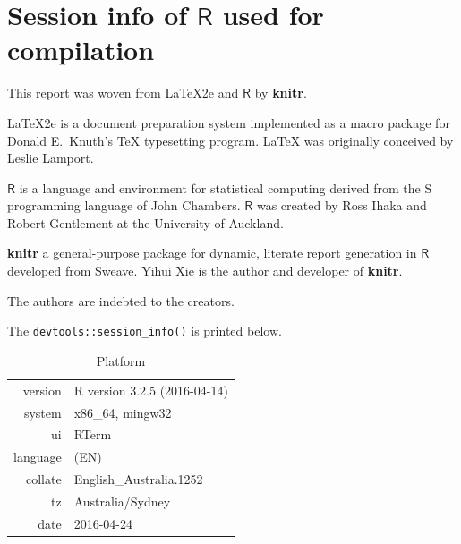 \documentclass{grattan}\usepackage[]{graphicx}\usepackage[]{color}
\begin{document}
\chapter{Session info of $\mathsf{R}$ used for compilation}
\begin{multicols*}{2}
This report was woven from  \textrm{\LaTeX2e} and $\mathsf{R}$ by \textbf{knitr}. 

\textrm{\LaTeX2e} is a document preparation system implemented as a macro package for Donald E.\ Knuth's \textrm{\TeX} typesetting program. \textrm{\LaTeX} was originally conceived by Leslie Lamport. 

$\mathsf{R}$ is a language and environment for statistical computing derived from the S programming language of John Chambers. $\mathsf{R}$ was created by Ross Ihaka and Robert Gentlement at the University of Auckland. 

\textbf{knitr} a general-purpose package for dynamic, literate report generation in $\mathsf{R}$ developed from Sweave. Yihui Xie is the author and developer of \textbf{knitr}. 

The authors are indebted to the creators.

The \verb=devtools::session_info()= is printed below.
\end{multicols*}


\begin{table}[!htb]
\centering
\caption{Platform}
\begin{tabular}{rl}
  \toprule
 version & R version 3.2.5 (2016-04-14) \\ 
  system & x86\_64, mingw32 \\ 
  ui & RTerm \\ 
  language & (EN) \\ 
  collate & English\_Australia.1252 \\ 
  tz & Australia/Sydney \\ 
  date & 2016-04-24 \\ 
   \bottomrule
\end{tabular}

\end{table}

\end{document}

